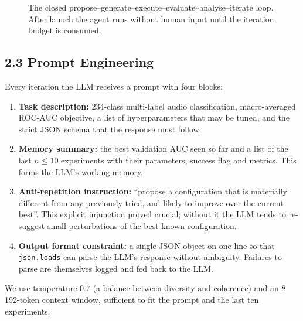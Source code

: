 \documentclass[11pt,a4paper]{article}
\begin{document}
\begin{figure}[h]
\centering
{}
\caption{The closed propose--generate--execute--evaluate--analyse--iterate loop. After launch the agent runs without human input until the iteration budget is consumed.}
\end{figure}

\subsection*{2.3 Prompt Engineering}

Every iteration the LLM receives a prompt with four blocks:
\begin{enumerate}
\item \textbf{Task description:} 234-class multi-label audio classification, macro-averaged ROC-AUC objective, a list of hyperparameters that may be tuned, and the strict JSON schema that the response must follow.
\item \textbf{Memory summary:} the best validation AUC seen so far and a list of the last $n \le 10$ experiments with their parameters, success flag and metrics. This forms the LLM's working memory.
\item \textbf{Anti-repetition instruction:} ``propose a configuration that is materially different from any previously tried, and likely to improve over the current best''. This explicit injunction proved crucial; without it the LLM tends to re-suggest small perturbations of the best known configuration.
\item \textbf{Output format constraint:} a single JSON object on one line so that \texttt{json.loads} can parse the LLM's response without ambiguity. Failures to parse are themselves logged and fed back to the LLM.
\end{enumerate}
We use temperature $0.7$ (a balance between diversity and coherence) and an 8\,192-token context window, sufficient to fit the prompt and the last ten experiments.
\end{document}
